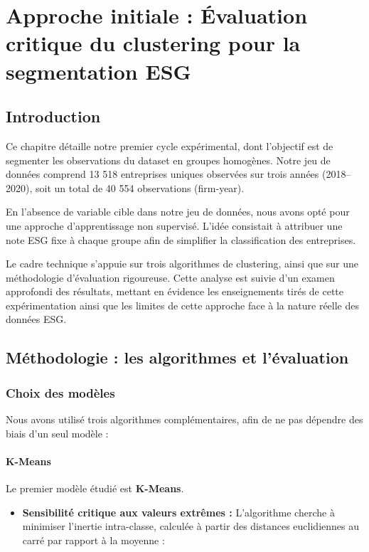 \chapter{Approche initiale : Évaluation critique du clustering pour la segmentation ESG}

\section*{Introduction}

Ce chapitre détaille notre premier cycle expérimental, dont l’objectif est de segmenter les observations du dataset en groupes homogènes. Notre jeu de données comprend 13 518 entreprises uniques observées sur trois années (2018--2020), soit un total de 40 554 observations (firm-year).

En l’absence de variable cible dans notre jeu de données, nous avons opté pour une approche d’apprentissage non supervisé. L’idée consistait à attribuer une note ESG fixe à chaque groupe afin de simplifier la classification des entreprises.

Le cadre technique s’appuie sur trois algorithmes de clustering, ainsi que sur une méthodologie d’évaluation rigoureuse. Cette analyse est suivie d’un examen approfondi des résultats, mettant en évidence les enseignements tirés de cette expérimentation ainsi que les limites de cette approche face à la nature réelle des données ESG.

\section{Méthodologie : les algorithmes et l’évaluation}
\subsection{Choix des modèles}
Nous avons utilisé trois algorithmes complémentaires, afin de ne pas dépendre des biais d’un seul modèle :
\subsubsection{K-Means}
Le premier modèle étudié est\textbf{ K-Means}.

\begin{itemize}
    \item \textbf{Sensibilité critique aux valeurs extrêmes :} L'algorithme cherche à minimiser l'inertie intra-classe, calculée à partir des distances euclidiennes au carré par rapport à la moyenne :
\end{itemize}

